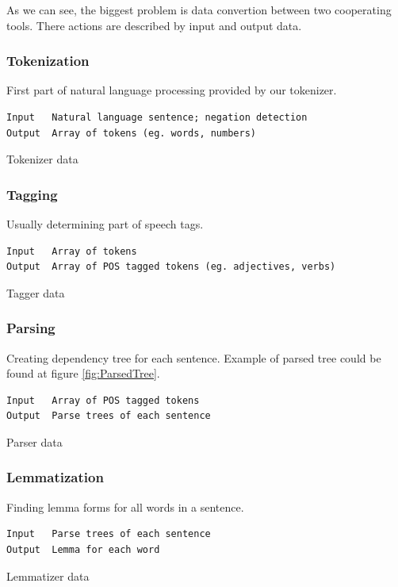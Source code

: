 As we can see, the biggest problem is data convertion between two cooperating tools. There actions are described by input and output data.

\subsubsection{Tokenization}
First part of natural language processing provided by our tokenizer.
\begin{table}[ht]   %
\begin{center}
    \begin{verbatim}
Input 	Natural language sentence; negation detection
Output 	Array of tokens (eg. words, numbers) 
        \end{verbatim}
  \caption{Tokenizer data}
  \label{tab.tokenization}
\end{center}
\end{table} 

\subsubsection{Tagging}
Usually determining part of speech tags.
\begin{table}[ht]   %
\begin{center}
    \begin{verbatim}
Input 	Array of tokens
Output 	Array of POS tagged tokens (eg. adjectives, verbs) 
        \end{verbatim}
  \caption{Tagger data}
  \label{tab.tagging}
\end{center}
\end{table} 

\subsubsection{Parsing}
Creating dependency tree for each sentence. Example of parsed tree could be found at figure \ref{fig:ParsedTree}. 

\begin{table}[ht]   %
\begin{center}
    \begin{verbatim}
Input 	Array of POS tagged tokens
Output 	Parse trees of each sentence 
        \end{verbatim}
  \caption{Parser data}
  \label{tab.parsing}
\end{center}
\end{table}  

\subsubsection{Lemmatization}
Finding lemma forms for all words in a sentence.
\begin{table}[ht]   %
\begin{center}
    \begin{verbatim}
Input 	Parse trees of each sentence
Output 	Lemma for each word 
        \end{verbatim}
  \caption{Lemmatizer data}
  \label{tab.lemmatizer}
\end{center}
\end{table} 

